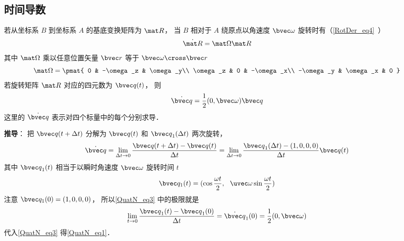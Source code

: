 \subsection{时间导数}
若从坐标系 $B$ 到坐标系 $A$ 的基底变换矩阵为 $\mat R$， 当 $B$ 相对于 $A$ 绕原点以角速度 $\bvec \omega$ 旋转时有（\autoref{RotDer_eq4}~）
\begin{equation}
\dot{\mat R} = \mat \Omega \mat R
\end{equation}
其中 $\mat\Omega$ 乘以任意位置矢量 $\bvec r$ 等于 $\bvec \omega \cross \bvec r$
\begin{equation}
\mat \Omega = \pmat{
0 & -\omega_z & \omega_y\\
\omega_z & 0 & -\omega_x\\
-\omega_y & \omega_x & 0
}\end{equation}
若旋转矩阵 $\mat R$ 对应的四元数为 $\bvec q(t)$， 则
\begin{equation}\label{QuatN_eq1}
\dot {\bvec q} = \frac12 (0, \bvec \omega) \bvec q
\end{equation}
这里的 $\dot{\bvec q}$ 表示对四个标量中的每个分别求导．

\textbf{推导}： 把 ${\bvec q}(t+\Delta t)$ 分解为 ${\bvec q}(t)$ 和 ${\bvec q}_1(\Delta t)$ 两次旋转， 
\begin{equation}\label{QuatN_eq3}
\dot {\bvec q}
= \lim_{\Delta t\to 0}\frac{{\bvec q}(t+\Delta t) - {\bvec q}(t)}{\Delta t}
= \lim_{\Delta t\to 0}\frac{{\bvec q}_1(\Delta t) - (1,0,0,0)}{\Delta t}\bvec q(t)
\end{equation}
其中 ${\bvec q}_1(t)$ 相当于以瞬时角速度 $\bvec \omega$ 旋转时间 $t$
\begin{equation}
{\bvec q_1}(t) = (\cos\frac{\omega t}{2},\ \ \uvec \omega \sin\frac{\omega t}{2})
\end{equation}
注意 $\bvec q_1(0) = (1,0,0,0)$， 所以\autoref{QuatN_eq3} 中的极限就是
\begin{equation}
\lim_{t\to 0}\frac{{\bvec q}_1(t) - {\bvec q}_1(0)}{\Delta t} = \dot{\bvec q}_1(0) = \frac{1}{2}(0, \bvec\omega)
\end{equation}
代入\autoref{QuatN_eq3} 得\autoref{QuatN_eq1}．
